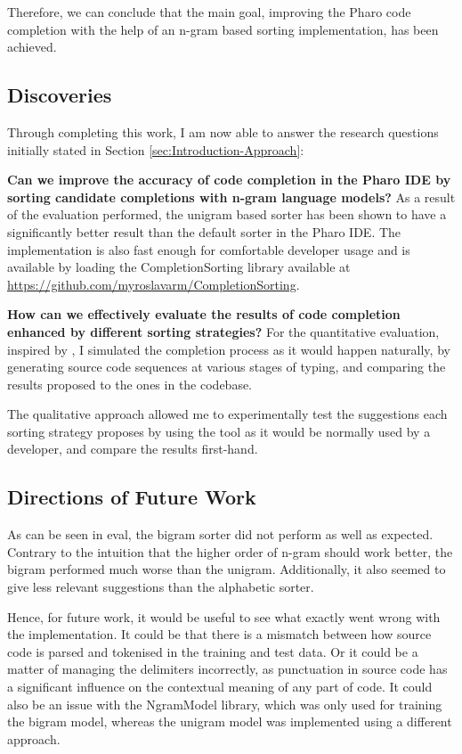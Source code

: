 \documentclass[sigplan,screen]{acmart}
\begin{document}
Therefore, we can conclude that the main goal, improving the Pharo code completion with the help of an n-gram based sorting implementation, has been achieved.

\subsection{Discoveries}
Through completing this work, I am now able to answer the research questions initially stated in Section \ref{sec:Introduction-Approach}:
\begin{RQ}
    \item \textbf{Can we improve the accuracy of code completion in the Pharo IDE by sorting candidate completions with n-gram language models?} As a result of the evaluation performed, the unigram based sorter has been shown to have a significantly better result than the default sorter in the Pharo IDE. The implementation is also fast enough for comfortable developer usage and is available by loading the CompletionSorting library available at \url{https://github.com/myroslavarm/CompletionSorting}.
    \item \textbf{How can we effectively evaluate the results of code completion enhanced by different sorting strategies?} For the quantitative evaluation, inspired by \cite{Robb08a}, I simulated the completion process as it would happen naturally, by generating source code sequences at various stages of typing, and comparing the results proposed to the ones in the codebase.
    
    The qualitative approach allowed me to experimentally test the suggestions each sorting strategy proposes by using the tool as it would be normally used by a developer, and compare the results first-hand.
\end{RQ}

\subsection{Directions of Future Work}
As can be seen in eval, the bigram sorter did not perform as well as expected. Contrary to the intuition that the higher order of n-gram should work better, the bigram performed much worse than the unigram. Additionally, it also seemed to give less relevant suggestions than the alphabetic sorter.

Hence, for future work, it would be useful to see what exactly went wrong with the implementation. It could be that there is a mismatch between how source code is parsed and tokenised in the training and test data. Or it could be a matter of managing the delimiters incorrectly, as punctuation in source code has a significant influence on the contextual meaning of any part of code. It could also be an issue with the NgramModel library, which was only used for training the bigram model, whereas the unigram model was implemented using a different approach.
\end{document}
